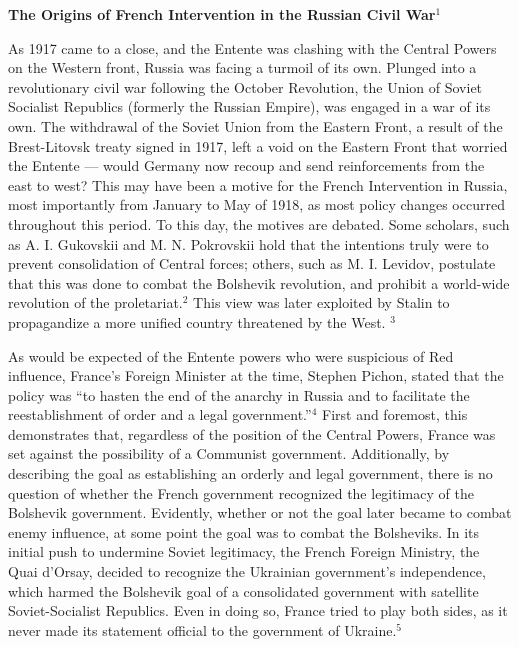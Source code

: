 



\begin{center}

  \textbf{The Origins of French Intervention in the Russian Civil War}$^1$

\end{center}

\begin{justify}

  \hspace{.5in} As 1917 came to a close, and the Entente was clashing with the Central Powers on the Western front, Russia was facing a turmoil of its own. Plunged into a revolutionary civil war following the October Revolution, the Union of Soviet Socialist Republics (formerly the Russian Empire), was engaged in a war of its own. The withdrawal of the Soviet Union from the Eastern Front, a result of the Brest-Litovsk treaty signed in 1917, left a void on the Eastern Front that worried the Entente — would Germany now recoup and send reinforcements from the east to west? This may have been a motive for the French Intervention in Russia, most importantly from January to May of 1918, as most policy changes occurred throughout this period. To this day, the motives are debated. Some scholars, such as A. I. Gukovskii and M. N. Pokrovskii hold that the intentions truly were to prevent consolidation of Central forces; others, such as M. I. Levidov, postulate that this was done to combat the Bolshevik revolution, and prohibit a world-wide revolution of the proletariat.$^{2}$ This view was later exploited by Stalin to propagandize a more unified country threatened by the West. $^{3}$

  \hspace{.5in} As would be expected of the Entente powers who were suspicious of Red influence, France's Foreign Minister at the time, Stephen Pichon, stated that the policy was ``to hasten the end of the anarchy in Russia and to facilitate the reestablishment of order and a legal government.''$^{4}$ First and foremost, this demonstrates that, regardless of the position of the Central Powers, France was set against the possibility of a Communist government. Additionally, by describing the goal as establishing an orderly and legal government, there is no question of whether the French government recognized the legitimacy of the Bolshevik government. Evidently, whether or not the goal later became to combat enemy influence, at some point the goal was to combat the Bolsheviks. In its initial push to undermine Soviet legitimacy, the French Foreign Ministry, the Quai d'Orsay, decided to recognize the Ukrainian government's independence, which harmed the Bolshevik goal of a consolidated government with satellite Soviet-Socialist Republics. Even in doing so, France tried to play both sides, as it never made its statement official to the government of Ukraine.$^{5}$


\end{justify}
